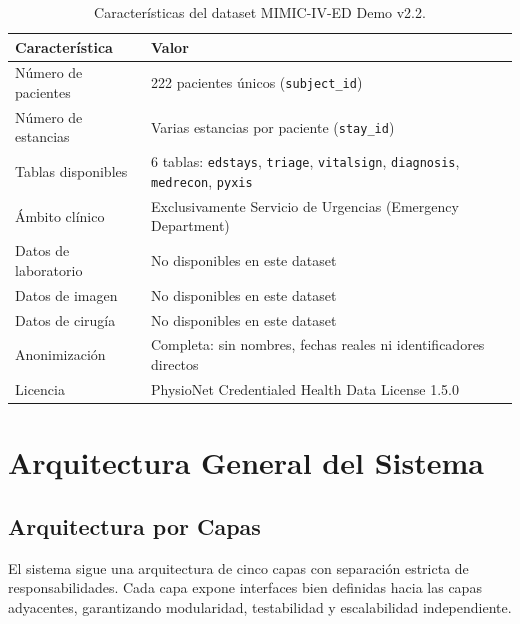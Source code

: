 ﻿\documentclass[11pt,a4paper]{article}
\begin{document}
\begin{table}[H]
\centering
\caption{Caracter\'isticas del dataset MIMIC-IV-ED Demo v2.2.}
\label{tab:dataset}
\begin{tabularx}{\textwidth}{lX}
\toprule
\textbf{Caracter\'istica} & \textbf{Valor} \\
\midrule
N\'umero de pacientes & 222 pacientes \'unicos (\texttt{subject\_id}) \\
N\'umero de estancias & Varias estancias por paciente (\texttt{stay\_id}) \\
Tablas disponibles & 6 tablas: \texttt{edstays}, \texttt{triage}, \texttt{vitalsign}, \texttt{diagnosis}, \texttt{medrecon}, \texttt{pyxis} \\
\'Ambito cl\'inico & Exclusivamente Servicio de Urgencias (Emergency Department) \\
Datos de laboratorio & No disponibles en este dataset \\
Datos de imagen & No disponibles en este dataset \\
Datos de cirug\'ia & No disponibles en este dataset \\
Anonimizaci\'on & Completa: sin nombres, fechas reales ni identificadores directos \\
Licencia & PhysioNet Credentialed Health Data License 1.5.0 \\
\bottomrule
\end{tabularx}
\end{table}

\section{Arquitectura General del Sistema}

\subsection{Arquitectura por Capas}

El sistema sigue una arquitectura de cinco capas con separaci\'on estricta de responsabilidades. Cada capa expone interfaces bien definidas hacia las capas adyacentes, garantizando modularidad, testabilidad y escalabilidad independiente.
\end{document}
